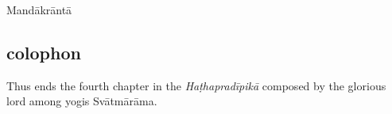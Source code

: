 \begin{ekdosis}



\begin{metre}[hp04_075_1]
Mandākrāntā 
\end{metre}

\subsection*{colophon}
\begin{translation}[hp04_col]
Thus ends the fourth chapter in the \emph{Haṭhapradīpikā} composed by the glorious lord among yogis Svātmārāma.    
\end{translation}



\end{ekdosis}

